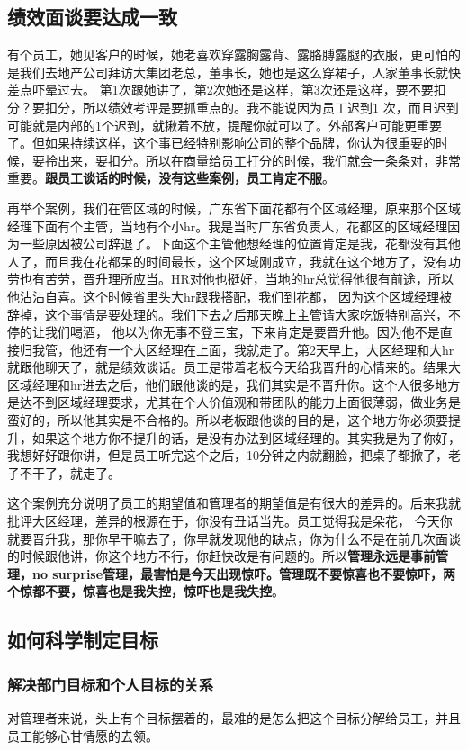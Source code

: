 \documentclass[12pt]{article}
\begin{document}
\subsection{绩效面谈要达成一致}
有个员工，她见客户的时候，她老喜欢穿露胸露背、露胳膊露腿的衣服，更可怕的是我们去地产公司拜访大集团老总，董事长，她也是这么穿裙子，人家董事长就快差点吓晕过去。 第1次跟她讲了，第2次她还是这样，第3次还是这样，要不要扣分？要扣分，所以绩效考评是要抓重点的。我不能说因为员工迟到1 次，而且迟到可能就是内部的1个迟到，就揪着不放，提醒你就可以了。外部客户可能更重要了。但如果持续这样，这个事已经特别影响公司的整个品牌，你认为很重要的时候，要拎出来，要扣分。所以在商量给员工打分的时候，我们就会一条条对，非常重要。\textbf{跟员工谈话的时候，没有这些案例，员工肯定不服}。

再举个案例，我们在管区域的时候，广东省下面花都有个区域经理，原来那个区域经理下面有个主管，当地有个小hr。我是当时广东省负责人，花都区的区域经理因为一些原因被公司辞退了。下面这个主管他想经理的位置肯定是我，花都没有其他人了，而且我在花都呆的时间最长，这个区域刚成立，我就在这个地方了，没有功劳也有苦劳，晋升理所应当。HR对他也挺好，当地的hr总觉得他很有前途，所以他沾沾自喜。这个时候省里头大hr跟我搭配，我们到花都， 因为这个区域经理被辞掉，这个事情是要处理的。我们下去之后那天晚上主管请大家吃饭特别高兴，不停的让我们喝酒， 他以为你无事不登三宝，下来肯定是要晋升他。因为他不是直接归我管，他还有一个大区经理在上面，我就走了。第2天早上，大区经理和大hr就跟他聊天了，就是绩效谈话。员工是带着老板今天给我晋升的心情来的。结果大区域经理和hr进去之后，他们跟他谈的是，我们其实是不晋升你。这个人很多地方是达不到区域经理要求，尤其在个人价值观和带团队的能力上面很薄弱，做业务是蛮好的，所以他其实是不合格的。所以老板跟他谈的目的是，这个地方你必须要提升，如果这个地方你不提升的话，是没有办法到区域经理的。其实我是为了你好，我想好好跟你讲，但是员工听完这个之后，10分钟之内就翻脸，把桌子都掀了，老子不干了，就走了。

这个案例充分说明了员工的期望值和管理者的期望值是有很大的差异的。后来我就批评大区经理，差异的根源在于，你没有丑话当先。员工觉得我是朵花， 今天你就要晋升我，那你早干嘛去了，你早就发现他的缺点，你为什么不是在前几次面谈的时候跟他讲，你这个地方不行，你赶快改是有问题的。所以\textbf{管理永远是事前管理，no surprise管理，最害怕是今天出现惊吓。管理既不要惊喜也不要惊吓，两个惊都不要，惊喜也是我失控，惊吓也是我失控}。

\subsection{如何科学制定目标}
\subsubsection{解决部门目标和个人目标的关系}
对管理者来说，头上有个目标摆着的，最难的是怎么把这个目标分解给员工，并且员工能够心甘情愿的去领。
\end{document}
